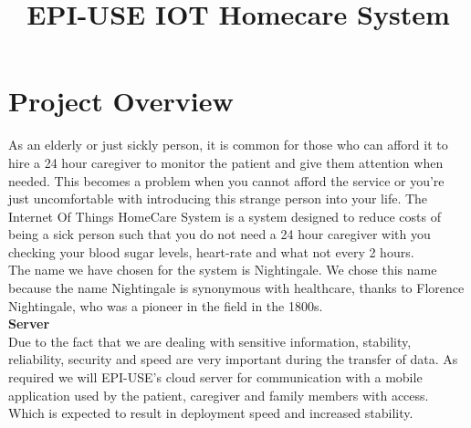 \documentclass[12pt]{article}
\title{EPI-USE IOT Homecare System}
\begin{document}
    \newcommand{\titleimage}{iot.png}
    \newcommand{\titlecompany}{Epi-Use}
    
    
    
	
	\newpage

	\section{Project Overview}
	As an elderly or just sickly person, it is common for those who can afford it to hire a 24 hour caregiver to monitor the patient and give them attention when needed. This becomes a problem when you cannot afford the service or you're just uncomfortable with introducing this strange person into your life. The Internet Of Things HomeCare System is a system designed to reduce costs of being a sick person such that you do not need a 24 hour caregiver with you checking your blood sugar levels, heart-rate and what not every 2 hours. \\
	
	The name we have chosen for the system is Nightingale. We chose this name because the name Nightingale is synonymous with healthcare, thanks to Florence Nightingale, who was a pioneer in the field in the 1800s.\\
	
\textbf{Server}\\
	Due to the fact that we are dealing with sensitive information, stability, reliability, security and speed are very important during the transfer of data. As required we will EPI-USE's cloud server for communication with a mobile application used by the patient, caregiver and family members with access. Which is expected to result in deployment speed and increased stability.\\ 
	
\end{document}
